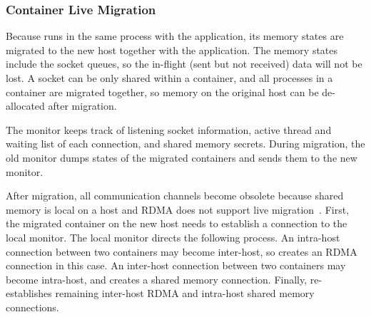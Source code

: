 \subsubsection{Container Live Migration}
\label{subsubsec:container_live_migration}
\quad

Because \libipc{} runs in the same process with the application, its memory states are migrated to the new host together with the application.
The memory states include the socket queues, so the in-flight (sent but not received) data will not be lost.
A socket can be only shared within a container, and all processes in a container are migrated together, so memory on the original host can be de-allocated after migration.

The monitor keeps track of listening socket information, active thread and waiting list of each connection, and shared memory secrets.
During migration, the old monitor dumps states of the migrated containers and sends them to the new monitor.

After migration, all communication channels become obsolete because shared memory is local on a host and RDMA does not support live migration~\cite{nsdi19freeflow,slim}.
First, the migrated container on the new host needs to establish a connection to the local monitor.
The local monitor directs the following process.
An intra-host connection between two containers may become inter-host, so \libipc{} creates an RDMA connection in this case.
An inter-host connection between two containers may become intra-host, and \libipc{} creates a shared memory connection.
Finally, \libipc{} re-establishes remaining inter-host RDMA and intra-host shared memory connections.





